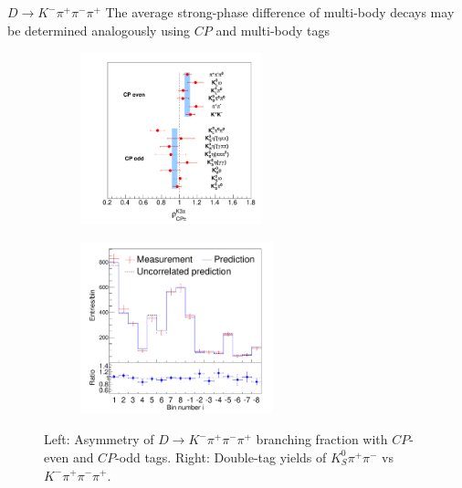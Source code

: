 \documentclass{beamer}
\begin{document}
\begin{frame}{$D\to K^-\pi^+\pi^-\pi^+$}
  \vspace{0.0cm}
  {\large The average strong-phase difference of multi-body decays may be determined analogously using $C\!P$ and multi-body tags}
  \begin{figure}
    \centering
    \begin{subfigure}{0.4\textwidth}
      \centering
      \includegraphics[height=5.0cm]{Figures/K3pi_CP_Asymmetry.pdf}
    \end{subfigure}%
    \begin{subfigure}{0.6\textwidth}
      \centering
      \includegraphics[height=5.0cm]{Figures/K3pi_KSpipi_yields.pdf}
    \end{subfigure}
    \caption*{Left: Asymmetry of $D\to K^-\pi^+\pi^-\pi^+$ branching fraction with $C\!P$-even and $C\!P$-odd tags. Right: Double-tag yields of $K_S^0\pi^+\pi^-$ vs $K^-\pi^+\pi^-\pi^+$.}
  \end{figure}
\end{frame}
\end{document}
